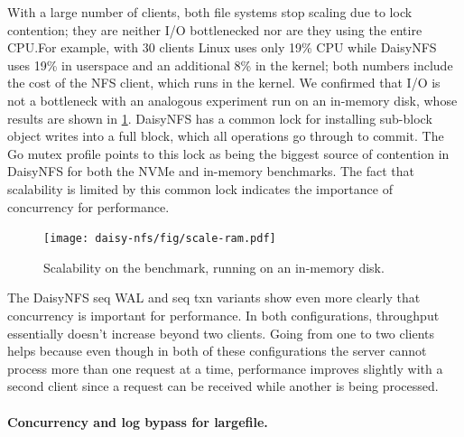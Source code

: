 With a large number of clients, both file systems
stop scaling due to lock contention; they are neither I/O bottlenecked nor are
they using the entire CPU.\@ For example, with 30 clients Linux uses only 19\% CPU
while DaisyNFS uses 19\% in userspace and an additional 8\% in the kernel; both
numbers include the cost of the NFS client, which runs in the kernel. We
confirmed that I/O is not a bottleneck with an analogous experiment run on an in-memory disk,
whose results are shown in \cref{fig:eval:scale:ram}. DaisyNFS has a common
lock for installing sub-block object writes into a full block, which all
operations go through to commit. The Go mutex profile points to this lock as
being the biggest source of contention in DaisyNFS for both the NVMe and
in-memory benchmarks. The fact that scalability is limited by this common lock indicates the importance of concurrency for performance.

\begin{figure}[ht]
  \centering
  \texttt{[image: daisy-nfs/fig/scale-ram.pdf]}
  \vspace{0.5\baselineskip}
  \caption[Concurrent smallfile performance on in-memory disk]%
  {Scalability on the  benchmark, running on an in-memory disk.}
  \label{fig:eval:scale:ram}
\end{figure}


The DaisyNFS seq WAL and seq txn variants show even more clearly that
concurrency is important for performance. In both configurations, throughput
essentially doesn't increase beyond two clients. Going from one to two clients
helps because even though in
both of these configurations the server cannot process more than one request at
a time, performance improves slightly with a second client since a request can
be received while another is being processed.

\paragraph{Concurrency and log bypass for largefile.}

